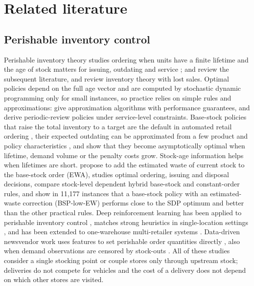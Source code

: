 \section{Related literature}\label{sec:literature}

\subsection{Perishable inventory control}

Perishable inventory theory studies ordering when units have a finite lifetime and the age of stock matters for issuing, outdating and service \citep{nahmias1982perishable}; \citet{bakker2012review} and \citet{janssen2016deteriorating} review the subsequent literature, and \citet{bijvank2011lost} review inventory theory with lost sales. Optimal policies depend on the full age vector and are computed by stochastic dynamic programming only for small instances, so practice relies on simple rules and approximations: \citet{chao2015approximation} give approximation algorithms with performance guarantees, and \citet{minner2010periodic} derive periodic-review policies under service-level constraints. Base-stock policies that raise the total inventory to a target are the default in automated retail ordering \citep{vandonselaar2006inventory}, their expected outdating can be approximated from a few product and policy characteristics \citep{vandonselaar2012approximations}, and \citet{bu2023asymptotic} show that they become asymptotically optimal when lifetime, demand volume or the penalty costs grow. Stock-age information helps when lifetimes are short. \citet{broekmeulen2009heuristic} propose to add the estimated waste of current stock to the base-stock order (EWA), \citet{haijema2014new} studies optimal ordering, issuing and disposal decisions, \citet{haijema2016stock} compare stock-level dependent hybrid base-stock and constant-order rules, and \citet{haijema2019improved} show in 11,177 instances that a base-stock policy with an estimated-waste correction (BSP-low-EW) performs close to the SDP optimum and better than the other practical rules. Deep reinforcement learning has been applied to perishable inventory control \citep{demoor2022reward,boute2022deep,temizoz2025deep}, matches strong heuristics in single-location settings \citep{gijsbrechts2022can}, and has been extended to one-warehouse multi-retailer systems \citep{kaynov2024deep}. Data-driven newsvendor work uses features to set perishable order quantities directly \citep{ban2019big,huber2019data}, also when demand observations are censored by stock-outs \citep{sachs2014data}. All of these studies consider a single stocking point or couple stores only through upstream stock; deliveries do not compete for vehicles and the cost of a delivery does not depend on which other stores are visited.

